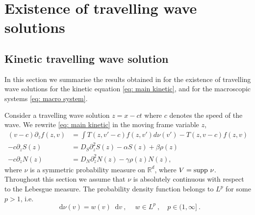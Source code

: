 \documentclass[11pt,twoside]{article}
\newcommand*\diff{\mathop{}\!\mathrm{d}}
\numberwithin{equation}{section}
\begin{document}



\section{Existence of travelling wave solutions}


\subsection{Kinetic travelling wave solution}
In this section we summarise the results obtained in \cite{calvez2016chemotactic} for the existence of travelling wave solutions for the kinetic equation \eqref{eq: main kinetic},  and for the macroscopic systems \eqref{eq: macro system}.

Consider a travelling wave solution $z=x-ct$ where $c$ denotes the speed of the wave. We rewrite \eqref{eq: main kinetic} in the moving frame variable $z$,
\begin{equation}
\begin{aligned}\label{system}
(v-c)\partial_zf(z,v)&=\int T(z,v'-c)f(z,v')d\nu(v')-T(z,v-c)f(z,v)\\
-c\partial_z S(z)&=D_S\partial_{z}^2S(z)-\alpha S(z)+\beta \rho(z)\\
-c\partial_zN(z)&=D_N\partial_{z}^2N(z)-\gamma\rho(z) N(z)
,
\end{aligned}
\end{equation}
where $\nu$ is a symmetric probability measure on $\mathbb{R}^d$, where $V=\textnormal{supp}\ \nu$. Throughout this section we assume that $\nu$ is absolutely continuous with respect to the Lebesgue measure. The probability density function belongs to $L^p$ for some $p > 1$, i.e.
\[
\diff \nu (v)=w(v)\diff v\ ,\ \quad w\in L^p\ , \quad p\in(1,\infty]\ .
\]
\end{document}

